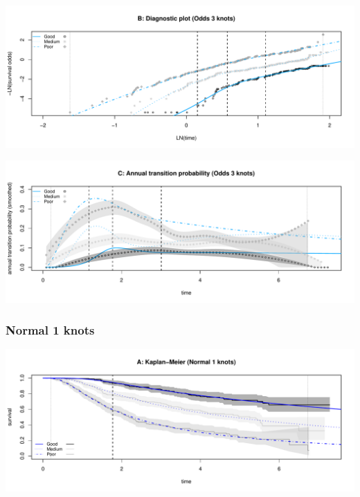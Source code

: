 \documentclass[
]{article}
\begin{document}
\begin{flushleft}\includegraphics[height=0.25\textheight]{BC_OS_output/Images/Figure_spline_models-17} \end{flushleft}

\begin{flushleft}\includegraphics[height=0.25\textheight]{BC_OS_output/Images/Figure_spline_models-18} \end{flushleft}

\clearpage

\subsubsection{Normal 1 knots}\label{normal-1-knots}

\begin{flushleft}\includegraphics[height=0.25\textheight]{BC_OS_output/Images/Figure_spline_models-19} \end{flushleft}
\end{document}
